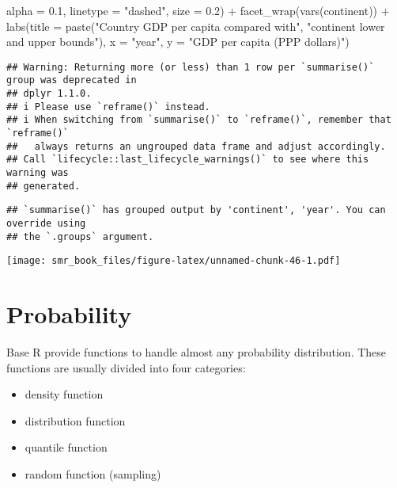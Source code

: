 \documentclass[
  oneside]{book}
\newenvironment{Shaded}{\begin{snugshade}}{\end{snugshade}}
\newcommand{\AttributeTok}[1]{\textcolor[rgb]{0.77,0.63,0.00}{#1}}
\newcommand{\FloatTok}[1]{\textcolor[rgb]{0.00,0.00,0.81}{#1}}
\newcommand{\FunctionTok}[1]{\textcolor[rgb]{0.00,0.00,0.00}{#1}}
\newcommand{\NormalTok}[1]{#1}
\newcommand{\SpecialCharTok}[1]{\textcolor[rgb]{0.00,0.00,0.00}{#1}}
\newcommand{\StringTok}[1]{\textcolor[rgb]{0.31,0.60,0.02}{#1}}
\providecommand{\tightlist}{%
  \setlength{\itemsep}{0pt}\setlength{\parskip}{0pt}}
\begin{document}
\begin{Shaded}
\begin{Highlighting}[]
              \AttributeTok{alpha =} \FloatTok{0.1}\NormalTok{, }\AttributeTok{linetype =} \StringTok{"dashed"}\NormalTok{, }\AttributeTok{size =} \FloatTok{0.2}\NormalTok{) }\SpecialCharTok{+}
      \FunctionTok{facet\_wrap}\NormalTok{(}\FunctionTok{vars}\NormalTok{(continent)) }\SpecialCharTok{+}
      \FunctionTok{labs}\NormalTok{(}\AttributeTok{title =} \FunctionTok{paste}\NormalTok{(}\StringTok{"Country GDP per capita compared with"}\NormalTok{,}
           \StringTok{"continent lower and upper bounds"}\NormalTok{),}
           \AttributeTok{x =} \StringTok{"year"}\NormalTok{, }\AttributeTok{y =} \StringTok{"GDP per capita (PPP dollars)"}\NormalTok{)}
\end{Highlighting}
\end{Shaded}

\begin{verbatim}
## Warning: Returning more (or less) than 1 row per `summarise()` group was deprecated in
## dplyr 1.1.0.
## i Please use `reframe()` instead.
## i When switching from `summarise()` to `reframe()`, remember that `reframe()`
##   always returns an ungrouped data frame and adjust accordingly.
## Call `lifecycle::last_lifecycle_warnings()` to see where this warning was
## generated.
\end{verbatim}

\begin{verbatim}
## `summarise()` has grouped output by 'continent', 'year'. You can override using
## the `.groups` argument.
\end{verbatim}

\texttt{[image: smr\_book\_files/figure-latex/unnamed-chunk-46-1.pdf]}

\hypertarget{probability}{%
\section{Probability}\label{probability}}

Base R provide functions to handle almost any probability distribution.
These functions are usually divided into four categories:

\begin{itemize}
\tightlist
\item
  density function
\item
  distribution function
\item
  quantile function
\item
  random function (sampling)
\end{itemize}
\end{document}
